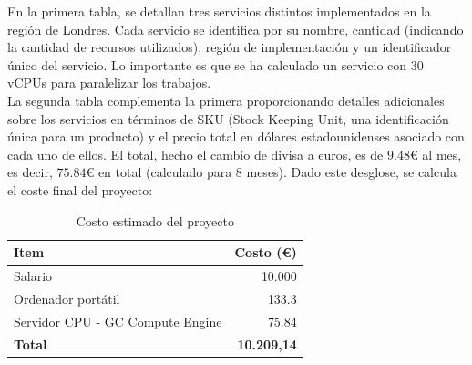 En la primera tabla, se detallan tres servicios distintos implementados en la región de Londres. Cada servicio se identifica por su nombre, cantidad (indicando la cantidad de recursos utilizados), región de implementación y un identificador único del servicio. Lo importante es que se ha calculado un servicio con $30$ vCPUs para paralelizar los trabajos.\\[6pt]

La segunda tabla complementa la primera proporcionando detalles adicionales sobre los servicios en términos de SKU (Stock Keeping Unit, una identificación única para un producto) y el precio total en dólares estadounidenses asociado con cada uno de ellos. El total, hecho el cambio de divisa a euros, es de $9.48$€ al mes, es decir, $75.84$€ en total (calculado para 8 meses).
Dado este desglose, se calcula el coste final del proyecto:
\begin{table}[h]
      \centering
      \begin{tabular}{|l|r|}
            \hline
            \textbf{Item}                    & \textbf{Costo (€)} \\ \hline
            Salario                          & 10.000             \\
            Ordenador portátil               & 133.3              \\
            Servidor CPU - GC Compute Engine & 75.84              \\
            \textbf{Total}                   & \textbf{10.209,14} \\ \hline
      \end{tabular}
      \caption{Costo estimado del proyecto}
      \label{tab:proyect_budget}
\end{table}